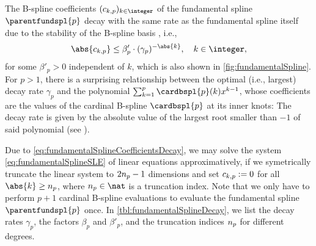 The B-spline coefficients $(\fundsplcoeff{k}{p})_{k \in \integer}$ of the
fundamental spline $\parentfundspl{p}$ decay with the same rate
as the fundamental spline itself due to the stability of the B-spline basis
\cite{Hoellig13Approximation}, i.e.,
\begin{equation}
  \label{eq:fundamentalSplineCoefficientsDecay}
  \abs{\fundsplcoeff{k}{p}}
  \le \beta'_p \cdot (\gamma_p)^{-\abs{k}},\quad
  k \in \integer,
\end{equation}
for some $\beta'_p > 0$ independent of $k$,
which is also shown in \cref{fig:fundamentalSpline}.
For $p > 1$,
there is a surprising relationship between the optimal (i.e., largest)
decay rate $\gamma_p$ and the polynomial
$\sum_{k=1}^p \cardbspl{p}(k) x^{k-1}$,
whose coefficients are the values of the
cardinal B-spline $\cardbspl{p}$ at its inner knots:
The decay rate is given by the absolute value of the largest root smaller
than $-1$ of said polynomial
(see ).

Due to \eqref{eq:fundamentalSplineCoefficientsDecay},
we may solve the system \eqref{eq:fundamentalSplineSLE}
of linear equations approximatively,
if we symetrically truncate the linear system to
$2n_{p} - 1$ dimensions
and set $\fundsplcoeff{k}{p} := 0$ for all $\abs{k} \ge \fundsplcutoff{p}$,
where $\fundsplcutoff{p} \in \nat$ is a truncation index.
Note that we only have to perform $p + 1$ cardinal B-spline evaluations
to evaluate the fundamental spline $\parentfundspl{p}$ once.
In \cref{tbl:fundamentalSplineDecay}, we list the decay rates $\gamma_p$,
the factors $\beta_p$ and $\beta'_p$, and the truncation indices
$n_{p}$ for different degrees.

